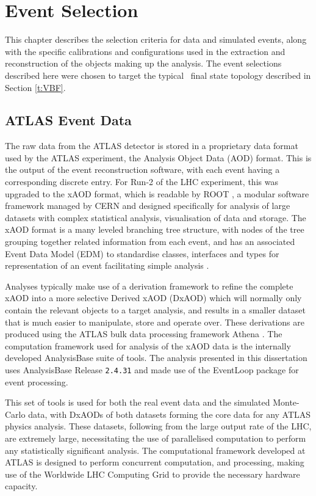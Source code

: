 \chapter{Event Selection}\label{c:ES}

	This chapter describes the selection criteria for data and simulated events, along with the specific calibrations and configurations used in the extraction and reconstruction of the objects making up the analysis. The event selections described here were chosen to target the typical \VBFHBB\, final state topology described in Section \ref{t:VBF}.

	\section{ATLAS Event Data}

	The raw data from the ATLAS detector is stored in a proprietary data format used by the ATLAS experiment, the Analysis Object Data (AOD) format. This is the output of the event reconstruction software, with each event having a corresponding discrete entry. For Run-2 of the LHC experiment, this was upgraded to the xAOD format, which is readable by ROOT \cite{ROOT}, a modular software framework managed by CERN and designed specifically for analysis of large datasets with complex statistical analysis, visualisation of data and storage. The xAOD format is a many leveled branching tree structure, with nodes of the tree grouping together related information from each event, and has an associated Event Data Model (EDM) to standardise classes, interfaces and types for representation of an event facilitating simple analysis \cite{xAOD}.

	Analyses typically make use of a derivation framework to refine the complete xAOD into a more selective Derived xAOD (DxAOD) which will normally only contain the relevant objects to a target analysis, and results in a smaller dataset that is much easier to manipulate, store and operate over. These derivations are produced using the ATLAS bulk data processing framework Athena \cite{athena}. The computation framework used for analysis of the xAOD data is the internally developed AnalysisBase suite of tools. The analysis presented in this dissertation uses AnalysisBase Release \texttt{2.4.31} and made use of the EventLoop package for event processing.

	This set of tools is used for both the real event data and the simulated Monte-Carlo data, with DxAODs of both datasets forming the core data for any ATLAS physics analysis. These datasets, following from the large output rate of the LHC, are extremely large, necessitating the use of parallelised computation to perform any statistically significant analysis. The computational framework developed at ATLAS is designed to perform concurrent computation, and processing, making use of the Worldwide LHC Computing Grid \cite{grid} to provide the necessary hardware capacity.


